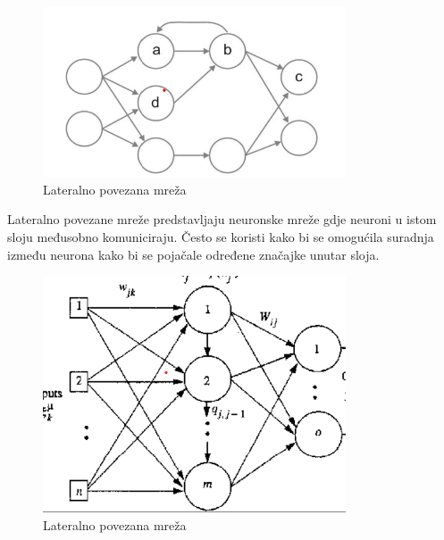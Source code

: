 \FloatBarrier
\begin{figure}[h]
    \centering
    \includegraphics[width=0.8\textwidth]{images/nn-povratna-veza}
    \caption{Lateralno povezana mreža}
    \label{fig:slika5}
\end{figure}
\FloatBarrier
\pagebreak
Lateralno povezane mreže predstavljaju neuronske mreže gdje neuroni u istom sloju međusobno komuniciraju.
Često se koristi kako bi se omogućila suradnja između neurona kako bi se pojačale određene značajke unutar sloja.
\FloatBarrier
\begin{figure}[h]
    \centering
    \includegraphics[width=0.8\textwidth]{images/Lateral-connected-nn}
    \caption{Lateralno povezana mreža}
    \label{fig:slika6}
\end{figure}
\FloatBarrier